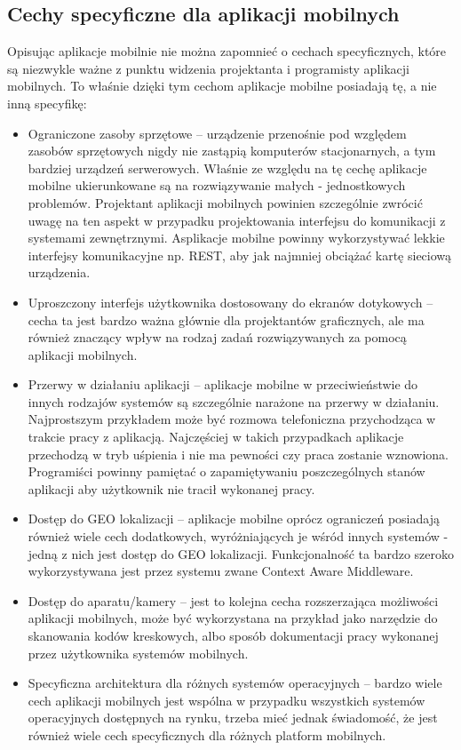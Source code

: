 \subsection{Cechy specyficzne dla aplikacji mobilnych }
\label{sec:cechyAplikacjiMobilnych}

Opisując aplikacje mobilnie nie można zapomnieć o cechach specyficznych, które są niezwykle ważne z punktu widzenia projektanta i programisty aplikacji mobilnych. To właśnie dzięki tym cechom aplikacje mobilne posiadają tę, a nie inną specyfikę:

\begin{itemize}
\item Ograniczone zasoby sprzętowe -- urządzenie przenośnie pod względem zasobów sprzętowych nigdy nie zastąpią komputerów stacjonarnych, a tym bardziej urządzeń serwerowych. Właśnie ze względu na tę cechę aplikacje mobilne ukierunkowane są na rozwiązywanie małych - jednostkowych problemów. Projektant aplikacji mobilnych powinien szczególnie zwrócić uwagę na ten aspekt w przypadku projektowania interfejsu do komunikacji z systemami zewnętrznymi. Asplikacje mobilne powinny wykorzystywać lekkie interfejsy komunikacyjne np. REST, aby jak najmniej obciążać kartę sieciową urządzenia. 
\item Uproszczony interfejs użytkownika dostosowany do ekranów dotykowych -- cecha ta jest bardzo ważna głównie dla projektantów graficznych, ale ma również znaczący wpływ na rodzaj zadań rozwiązywanych za pomocą aplikacji mobilnych.  
\item Przerwy w działaniu aplikacji -- aplikacje mobilne w przeciwieństwie do innych rodzajów systemów są szczególnie narażone na przerwy w działaniu. Najprostszym przykładem może być rozmowa telefoniczna przychodząca w trakcie pracy z aplikacją. Najczęściej w takich przypadkach aplikacje przechodzą w tryb uśpienia i nie ma pewności czy praca zostanie wznowiona. Programiści powinny pamiętać o zapamiętywaniu poszczególnych stanów aplikacji aby użytkownik nie tracił wykonanej pracy. 
\item Dostęp do GEO lokalizacji -- aplikacje mobilne oprócz ograniczeń posiadają również wiele cech dodatkowych, wyróżniających je wśród innych systemów - jedną z nich jest dostęp do GEO lokalizacji.  Funkcjonalność ta bardzo szeroko wykorzystywana jest przez systemu zwane Context Aware Middleware. 
\item Dostęp do aparatu/kamery -- jest to kolejna cecha rozszerzająca możliwości aplikacji mobilnych, może być wykorzystana na przykład jako narzędzie do skanowania kodów kreskowych, albo sposób dokumentacji pracy wykonanej przez użytkownika systemów mobilnych. 
\item Specyficzna architektura dla różnych systemów operacyjnych -- bardzo wiele cech aplikacji mobilnych jest wspólna w przypadku wszystkich systemów operacyjnych dostępnych na rynku, trzeba mieć jednak świadomość, że jest również wiele cech specyficznych dla różnych platform mobilnych. 
\end{itemize}

